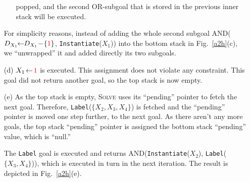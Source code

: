 \documentclass{ws-ijait}
\begin{document}
\begin{enumerate}
\begin{enumerate}
                         popped, and the second
                         \textsf{OR}-subgoal that is stored
                         in the previous inner stack will be
                         executed.
             \end{enumerate}
             For simplicity reasons, instead of adding the
             whole second subgoal \textsf{AND}($D_{X_1} \!\!
             \gets \!\! D_{X_1} \! - \!
             \{\textcolor{red}{1}\}$,
             \texttt{Instantiate}($X_1$)) into the bottom
             stack in Fig.~\ref{a2h}(c), we ``unwrapped'' it
             and added directly its two subgoals.
  \item[(d)] $X_1 \! \gets \! \textcolor{red}{1}$ is
             executed. This assignment does not violate any
             constraint. This goal did not return another
             goal, so the top stack is now empty.
  \item[(e)] As the top stack is empty, \textsc{Solve} uses
             its ``pending'' pointer to fetch the next goal.
             Therefore, \texttt{Label}($\{X_2, X_3, X_4\}$)
             is fetched and the ``pending'' pointer is moved
             one step further, to the next goal. As there
             aren't any more goals, the top stack
             ``pending'' pointer is assigned the bottom
             stack ``pending'' value, which is ``null.''

             The \texttt{Label} goal is executed and returns
             \textsf{AND}(\texttt{Instantiate}($X_2$),
             \texttt{Label}($\{X_3, X_4\}$)), which is
             executed in turn in the next iteration. The
             result is depicted in Fig.~\ref{a2h}(e).


\end{enumerate}
\end{document}
